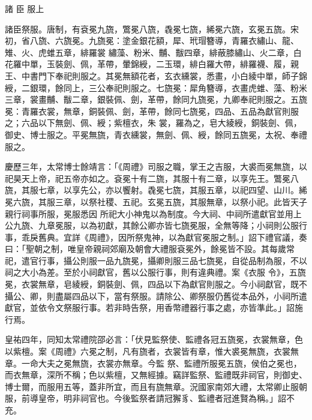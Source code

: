 
\begin{pinyinscope}

 諸
 臣
 服上



 諸臣祭服。唐制，有袞冕九旒，鷩冕八旒，毳冕七旒，絺冕六旒，玄冕五旒。宋初，省八旒、六旒冕。九旒冕：塗金銀花額，犀、玳瑁簪導，青羅衣繡山、龍、雉、火、虎蜼五章，緋羅裳
 繡藻、粉米、黼、黻四章，緋蔽膝繡山、火二章，白花羅中單，玉裝劍、佩，革帶，暈錦綬，二玉環，緋白羅大帶，緋羅襪、履，親王、中書門下奉祀則服之。其冕無額花者，玄衣纁裳，悉畫，小白綾中單，師子錦綬，二銀環，餘同上，三公奉祀則服之。七旒冕：犀角簪導，衣畫虎蜼、藻、粉米三章，裳畫黼、黻二章，銀裝佩、劍，革帶，餘同九旒冕，九卿奉祀則服之。五旒冕：青羅衣裳，無章，銅裝佩、劍，革帶，餘同七旒冕，四品、五品為獻官則服之；六品以下無劍、佩、綬；紫檀衣，朱
 裳，羅為之，皂大綾綬，銅裝劍、佩，御史、博士服之。平冕無旒，青衣纁裳，無劍、佩、綬，餘同五旒冕，太祝、奉禮服之。



 慶歷三年，太常博士餘靖言：「《周禮》司服之職，掌王之吉服，大裘而冕無旒，以祀昊天上帝，祀五帝亦如之。袞冕十有二旒，其服十有二章，以享先王。鷩冕八旒，其服七章，以享先公，亦以饗射。毳冕七旒，其服五章，以祀四望、山川。絺冕六旒，其服三章，以祭社稷、五祀。玄冕五旒，其服無章，以祭小祀。此皆天子親行祠事所服，冕服悉因
 所祀大小神鬼以為制度。今大祠、中祠所遣獻官並用上公九旒、九章冕服，以為初獻，其餘公卿亦皆七旒冕服，全無等降；小祠則公服行事，乖戾舊典。宜詳《周禮》，因所祭鬼神，以為獻官冕服之制。」詔下禮官議，奏曰：「聖朝之制，唯皇帝親祠郊廟及朝會大禮服袞冕外，餘冕皆不設。其每歲常祀，遣官行事，攝公則服一品九旒冕，攝卿則服三品七旒冕，自從品制為服，不以祠之大小為差。至於小祠獻官，舊以公服行事，則有違典禮。案《衣服
 令》，五旒冕，衣裳無章，皂綾綬，銅裝劍、佩，四品以下為獻官則服之。今小祠獻官，既不攝公、卿，則盡屬四品以下，當有祭服。請除公、卿祭服仍舊從本品外，小祠所遣獻官，並依令文祭服行事。若非時告祭，用香幣禮器行事之處，亦皆準此。」詔施行焉。



 皇祐四年，同知太常禮院邵必言：「伏見監祭使、監禮各冠五旒冕，衣裳無章，色以紫檀。案《周禮》六冕之制，凡有旒者，衣裳皆有章，惟大裘冕無旒，衣裳無章。一命大夫之冕無旒，衣裳亦無章。今監
 祭、監禮所服冕五旒，侯伯之冕也，而衣無章，深所不稱；色以紫檀，又無經據。竊詳監祭、監禮既非祠官，則御史、博士爾，而服用五等，蓋非所宜，而且有旒無章。況國家南郊大禮，太常卿止服朝服，前導皇帝，明非祠官也。今後監祭者請冠獬豸、監禮者冠進賢為稱。」詔不充。




\end{pinyinscope}
